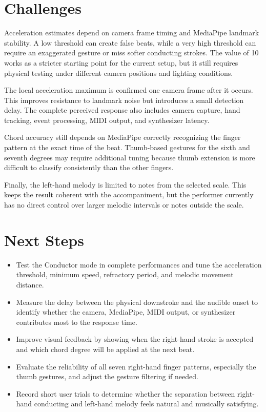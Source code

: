 \documentclass[11pt,a4paper]{article}
\begin{document}
\section{Challenges}

Acceleration estimates depend on camera frame timing and MediaPipe landmark
stability. A low threshold can create false beats, while a very high threshold
can require an exaggerated gesture or miss softer conducting strokes. The
value of 10 works as a stricter starting point for the current setup, but it
still requires physical testing under different camera positions and lighting
conditions.

The local acceleration maximum is confirmed one camera frame after it occurs.
This improves resistance to landmark noise but introduces a small detection
delay. The complete perceived response also includes camera capture, hand
tracking, event processing, MIDI output, and synthesizer latency.

Chord accuracy still depends on MediaPipe correctly recognizing the finger
pattern at the exact time of the beat. Thumb-based gestures for the sixth and
seventh degrees may require additional tuning because thumb extension is more
difficult to classify consistently than the other fingers.

Finally, the left-hand melody is limited to notes from the selected scale. This
keeps the result coherent with the accompaniment, but the performer currently
has no direct control over larger melodic intervals or notes outside the scale.

\section{Next Steps}

\begin{itemize}
    \item Test the Conductor mode in complete performances and tune the
    acceleration threshold, minimum speed, refractory period, and melodic
    movement distance.
    \item Measure the delay between the physical downstroke and the audible
    onset to identify whether the camera, MediaPipe, MIDI output, or synthesizer
    contributes most to the response time.
    \item Improve visual feedback by showing when the right-hand stroke is
    accepted and which chord degree will be applied at the next beat.
    \item Evaluate the reliability of all seven right-hand finger patterns,
    especially the thumb gestures, and adjust the gesture filtering if needed.
    \item Record short user trials to determine whether the separation between
    right-hand conducting and left-hand melody feels natural and musically
    satisfying.
\end{itemize}
\end{document}
